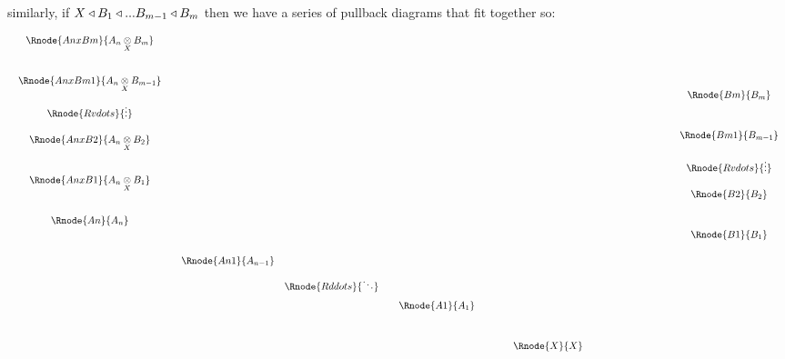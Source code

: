 \documentclass[10pt,a4paper]{scrartcl}
\begin{document}
similarly, if $X \triangleleft B_1 \triangleleft ... B_{m-1} \triangleleft B_m$ then we have a series of pullback diagrams that fit together so:

\begin{displaymath}
\begin{array}{cccp{2cm}c}
\begin{array} {c}
\Rnode{AnxBm}{\crossx{A_n}{B_m}{X}}      \\ [1.0cm]
\Rnode{AnxBm1}{\crossx{A_n}{B_{m-1}}{X}} \\ [0.5cm]
\raisebox{1.0cm}{$\Rnode{Rvdots}{\vdots}$}\\ [-0.5cm]
\Rnode{AnxB2}{\crossx{A_n}{B_2}{X}}       \\ [1.0cm]
\Rnode{AnxB1}{\crossx{A_n}{B_1}{X}}\\ [1.0cm]
\Rnode{An}{A_n}                    \\ [1.0cm]
         
\end{array} 
& & & &
\begin{array}{c}
                                    \\ [1.0cm]
              \Rnode{Bm}{B_m}       \\ [1.0cm]
              \Rnode{Bm1}{B_{m-1}}  \\ [0.5cm]
							\Rnode{Rvdots}{\vdots}\\ [0.5cm]
              \Rnode{B2}{B_2}       \\ [1.0cm]
              \Rnode{B1}{B_1}          
\end{array} \\
&\begin{array}{ccccc}
\Rnode{An1}{A_{n-1}}  \\ [0.25cm]
     &\Rnode{Rddots}{\ddots} \\ [0.25cm]
              &&&\Rnode{A1}{A_1}  \\ [1.0cm]
                 &&&&\hspace{1cm}\Rnode{X}{X} \\
\end{array} & & &
\end{array}
\end{displaymath}
 
\end{document}
